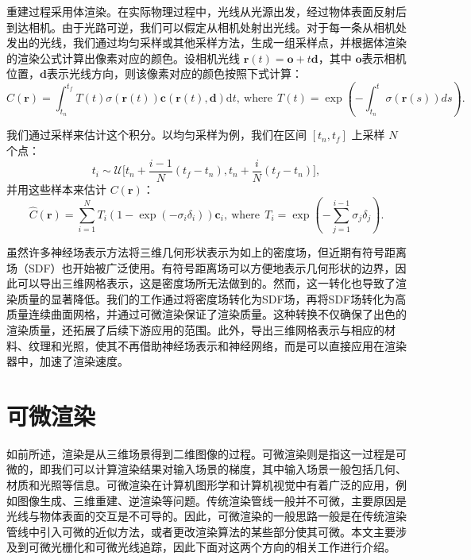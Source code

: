 重建过程采用体渲染。在实际物理过程中，光线从光源出发，经过物体表面反射后到达相机。由于光路可逆，我们可以假定从相机处射出光线。对于每一条从相机处发出的光线，我们通过均匀采样或其他采样方法，生成一组采样点，并根据体渲染的渲染公式计算出像素对应的颜色。设相机光线 $\mathbf{r}(t)=\mathbf{o}+t\mathbf{d}$，其中 $\mathbf{o}$表示相机位置，$\mathbf{d}$表示光线方向，则该像素对应的颜色按照下式计算：
\begin{equation}
  C(\mathbf{r})=\int_{t_n}^{t_f}T(t)\sigma(\mathbf{r}(t))\mathbf{c}(\mathbf{r}(t),\mathbf{d}) \mathrm{d}t , \ \mathrm{where} \ \ T(t)=\exp\left(-\int_{t_n}^t\sigma(\mathbf{r}(s))ds\right).
\end{equation}

我们通过采样来估计这个积分。以均匀采样为例，我们在区间 $[t_n,t_f]$ 上采样 $N$ 个点：
\begin{equation}
  t_i\sim\mathcal{U}\bigg[t_n+\frac{i-1}{N}(t_f-t_n), t_n+\frac{i}{N}(t_f-t_n)\bigg],
\end{equation}
并用这些样本来估计 $C(\mathbf{r})$：
\begin{equation}
  \hat C(\mathbf{r})=\sum_{i=1}^NT_i(1-\exp(-\sigma_i\delta_i))\mathbf{c}_i , \ \mathrm{where} \ \ T_i=\exp\left(-\sum_{j=1}^{i-1}\sigma_j\delta_j\right).
\end{equation}

虽然许多神经场表示方法将三维几何形状表示为如上的密度场，但近期有符号距离场（SDF）也开始被广泛使用。有符号距离场可以方便地表示几何形状的边界，因此可以导出三维网格表示，这是密度场所无法做到的。然而，这一转化也导致了渲染质量的显著降低。我们的工作通过将密度场转化为SDF场，再将SDF场转化为高质量连续曲面网格，并通过可微渲染保证了渲染质量。这种转换不仅确保了出色的渲染质量，还拓展了后续下游应用的范围。此外，导出三维网格表示与相应的材料、纹理和光照，使其不再借助神经场表示和神经网络，而是可以直接应用在渲染器中，加速了渲染速度。

\section{可微渲染}

如前所述，渲染是从三维场景得到二维图像的过程。可微渲染则是指这一过程是可微的，即我们可以计算渲染结果对输入场景的梯度，其中输入场景一般包括几何、材质和光照等信息。可微渲染在计算机图形学和计算机视觉中有着广泛的应用，例如图像生成、三维重建、逆渲染等问题。传统渲染管线一般并不可微，主要原因是光线与物体表面的交互是不可导的。因此，可微渲染的一般思路一般是在传统渲染管线中引入可微的近似方法，或者更改渲染算法的某些部分使其可微。本文主要涉及到可微光栅化和可微光线追踪，因此下面对这两个方向的相关工作进行介绍。


